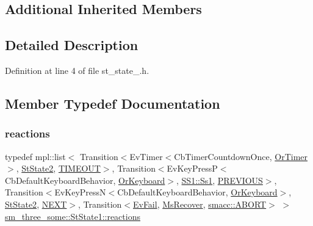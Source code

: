 \subsection*{Additional Inherited Members}


\subsection{Detailed Description}


Definition at line 4 of file st\+\_\+state\+\_.\+h.



\subsection{Member Typedef Documentation}
\mbox{\label{structsm__three__some_1_1StState1_a5c84a8c68b8a4c0d513c5c935cd85f5d}} 
\subsubsection{\texorpdfstring{reactions}{reactions}}
{\footnotesize\ttfamily typedef mpl\+::list$<$ Transition$<$Ev\+Timer$<$Cb\+Timer\+Countdown\+Once, \hyperlink{classsm__three__some_1_1OrTimer}{Or\+Timer}$>$, \hyperlink{structsm__three__some_1_1StState2}{St\+State2}, \hyperlink{structsm__three__some_1_1StState1_1_1TIMEOUT}{T\+I\+M\+E\+O\+UT}$>$, Transition$<$Ev\+Key\+PressP$<$Cb\+Default\+Keyboard\+Behavior, \hyperlink{classsm__three__some_1_1OrKeyboard}{Or\+Keyboard}$>$, \hyperlink{structsm__three__some_1_1SS1_1_1Ss1}{S\+S1\+::\+Ss1}, \hyperlink{structsm__three__some_1_1StState1_1_1PREVIOUS}{P\+R\+E\+V\+I\+O\+US}$>$, Transition$<$Ev\+Key\+PressN$<$Cb\+Default\+Keyboard\+Behavior, \hyperlink{classsm__three__some_1_1OrKeyboard}{Or\+Keyboard}$>$, \hyperlink{structsm__three__some_1_1StState2}{St\+State2}, \hyperlink{structsm__three__some_1_1StState1_1_1NEXT}{N\+E\+XT}$>$, Transition$<$\hyperlink{structsm__three__some_1_1EvFail}{Ev\+Fail}, \hyperlink{classsm__three__some_1_1MsRecover}{Ms\+Recover}, \hyperlink{structsmacc_1_1default__transition__tags_1_1ABORT}{smacc\+::\+A\+B\+O\+RT}$>$ $>$ \hyperlink{structsm__three__some_1_1StState1_a5c84a8c68b8a4c0d513c5c935cd85f5d}{sm\+\_\+three\+\_\+some\+::\+St\+State1\+::reactions}}



